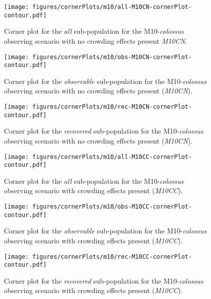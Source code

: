 \documentclass[twocolumn]{aastex63}
\begin{document}
\begin{figure}
    \centering
    \texttt{[image: figures/cornerPlots/m10/all-M10CN-cornerPlot-contour.pdf]}
    \caption{Corner plot for the \textit{all} sub-population for the M10-\textit{colossus} observing scenario with no crowding effects present \textit{M10CN}.}
    \label{fig:all-m10cn-All-corner-plot-appendix}
\end{figure}\clearpage
\begin{figure}
    \centering
    \texttt{[image: figures/cornerPlots/m10/obs-M10CN-cornerPlot-contour.pdf]}
    \caption{Corner plot for the \textit{observable} sub-population for the M10-\textit{colossus} observing scenario with no crowding effects present (\textit{M10CN}).}
    \label{fig:obs-m10cn-Obs-corner-plot-appendix}
\end{figure}\clearpage
\begin{figure}
    \centering
    \texttt{[image: figures/cornerPlots/m10/rec-M10CN-cornerPlot-contour.pdf]}
    \caption{Corner plot for the \textit{recovered} sub-population for the M10-\textit{colossus} observing scenario with no crowding effects present (\textit{M10CN}).}
    \label{fig:rec-m10cn-Rec-corner-plot-appendix}
\end{figure}\clearpage
\begin{figure}
    \centering
    \texttt{[image: figures/cornerPlots/m10/all-M10CC-cornerPlot-contour.pdf]}
    \caption{Corner plot for the \textit{all} sub-population for the M10-\textit{colossus} observing scenario with crowding effects present (\textit{M10CC}).}
    \label{fig:m10cc-All-corner-plot-appendix}
\end{figure}\clearpage
\begin{figure}
    \centering
    \texttt{[image: figures/cornerPlots/m10/obs-M10CC-cornerPlot-contour.pdf]}
    \caption{Corner plot for the \textit{observable} sub-population for the M10-\textit{colossus} observing scenario with crowding effects present (\textit{M10CC}).}
    \label{fig:m10cc-Obs-corner-plot-appendix}
\end{figure}\clearpage
\begin{figure}
    \centering
    \texttt{[image: figures/cornerPlots/m10/rec-M10CC-cornerPlot-contour.pdf]}
    \caption{Corner plot for the \textit{recovered} sub-population for the M10-\textit{colossus} observing scenario with crowding effects present (\textit{M10CC}).}
    \label{fig:m10cc-Rec-corner-plot-appendix}
\end{figure}\clearpage
\end{document}
